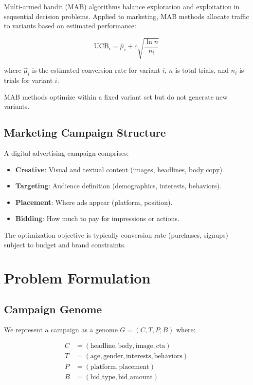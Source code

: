 \documentclass[11pt,twocolumn]{article}
\begin{document}
Multi-armed bandit (MAB) algorithms \cite{thompson1933} balance exploration and exploitation in sequential decision problems. Applied to marketing, MAB methods allocate traffic to variants based on estimated performance:

\begin{equation}
\text{UCB}_i = \hat{\mu}_i + c\sqrt{\frac{\ln n}{n_i}}
\end{equation}

where $\hat{\mu}_i$ is the estimated conversion rate for variant $i$, $n$ is total trials, and $n_i$ is trials for variant $i$.

MAB methods optimize within a fixed variant set but do not generate new variants.

\subsection{Marketing Campaign Structure}

A digital advertising campaign comprises:

\begin{itemize}
\item \textbf{Creative}: Visual and textual content (images, headlines, body copy).
\item \textbf{Targeting}: Audience definition (demographics, interests, behaviors).
\item \textbf{Placement}: Where ads appear (platform, position).
\item \textbf{Bidding}: How much to pay for impressions or actions.
\end{itemize}

The optimization objective is typically conversion rate (purchases, signups) subject to budget and brand constraints.

\section{Problem Formulation}

\subsection{Campaign Genome}

We represent a campaign as a genome $G = (C, T, P, B)$ where:

\begin{align}
C &= (\text{headline}, \text{body}, \text{image}, \text{cta}) \\
T &= (\text{age}, \text{gender}, \text{interests}, \text{behaviors}) \\
P &= (\text{platform}, \text{placement}) \\
B &= (\text{bid\_type}, \text{bid\_amount})
\end{align}
\end{document}
